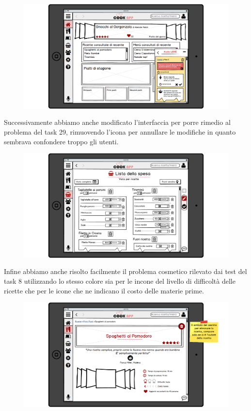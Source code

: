 \begin{figure}[H]
	\includegraphics[width=\linewidth]{img/mockup/Live3-fixed.png}
\end{figure}


Successivamente abbiamo anche modificato l'interfaccia per porre rimedio al
problema del task 29, rimuovendo l'icona per annullare le modifiche in
quanto sembrava confondere troppo gli utenti.


\begin{figure}[H]
	\includegraphics[width=\linewidth]{img/mockup/spesa-edit-fixed.png}
\end{figure}


Infine abbiamo anche risolto facilmente il problema cosmetico 
rilevato dai test del task 8 utilizzando lo stesso colore sia per le
incone del
livello di difficoltà delle ricette che per le icone che ne indicano il
costo delle materie prime.

\begin{figure}[H]
	\includegraphics[width=\linewidth]{img/mockup/Ricetta-fixed.png}
\end{figure}
